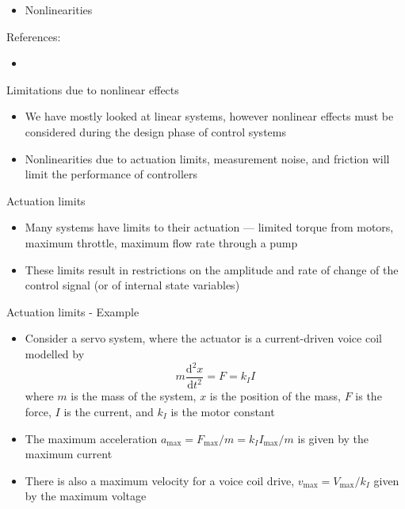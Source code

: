 \documentclass{beamer-control}
\begin{document}

\begin{SUMMARY}
\begin{itemize}
\item Nonlinearities
\end{itemize}
\vfill References:
\begin{itemize}
\item {}
\end{itemize}
\end{SUMMARY}




\begin{frame}{Limitations due to nonlinear effects}
\begin{itemize}
\item We have mostly looked at linear systems, however nonlinear effects must be considered during the design phase of control systems
\item Nonlinearities due to actuation limits, measurement noise, and friction will limit the performance of controllers
\end{itemize}
\end{frame}


\begin{frame}{Actuation limits}
	\begin{itemize}
		\item Many systems have limits to their actuation --- limited torque from motors, maximum throttle, maximum flow rate through a pump
		\item These limits result in restrictions on the amplitude and rate of change of the control signal (or of internal state variables)
	\end{itemize}
\end{frame} 


\begin{frame}{Actuation limits - Example}
	\begin{itemize}
		\item Consider a servo system, where the actuator is a current-driven voice coil modelled by
		\[m\frac{\mathrm{d}^2x}{\mathrm{d}t^2}=F=k_I I\]
		where $m$ is the mass of the system, $x$ is the position of the mass, $F$ is the force, $I$ is the current, and $k_I$ is the motor constant
		\item The maximum acceleration $a_{\text{max}} =F_{\text{max}}/m=k_I I_{\text{max}}/m $ is given by the maximum current
		\item There is also a maximum velocity for a voice coil drive, $v_{\text{max}}=V_{\text{max}}/k_I$ given by the maximum voltage
	\end{itemize}
\end{frame} 
\end{document}
